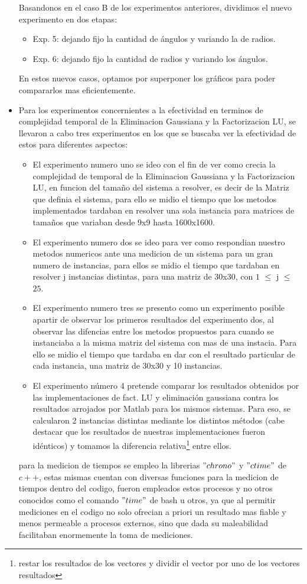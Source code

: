 \documentclass[12pt,a4paper]{article}
\begin{document}
\begin{itemize}
    Basandonos en el caso B de los experimentos anteriores, dividimos el nuevo experimento en dos etapas:
    \begin{itemize}
    	\item Exp. 5: dejando fijo la cantidad de ángulos y variando la de radios.
	    \item Exp. 6: dejando fijo la cantidad de radios y variando los ángulos.
   	\end{itemize}
En estos nuevos casos, optamos por superponer los gráficos para poder compararlos mas eficientemente.
    
   \item Para los experimentos concernientes a la efectividad en terminos de complejidad temporal de la Eliminacion Gaussiana y la Factorizacion LU, se llevaron a cabo tres experimentos en los que se buscaba ver la efectividad de estos para diferentes aspectos:
    \begin{itemize}
		\item El experimento numero uno se ideo con el fin de ver como crecia la complejidad de temporal de la Eliminacion Gaussiana y la Factorizacion LU, en funcion del tamaño del sistema a resolver, es decir de la Matriz que definia el sistema, para ello se midio el tiempo que los metodos implementados tardaban en resolver una sola instancia para matrices de tamaños que variaban desde 9x9 hasta 1600x1600.
		\item El experimento numero dos se ideo para ver como respondian nuestro metodos numericos ante una medicion de un sistema para un gran numero de instancias, para ellos se midio el tiempo que tardaban en resolver j instancias distintas, para una matriz de 30x30, con $1$ $\leq$ j $\leq$ $25$.   
        \item El experimento numero tres se presento como un experimento posible apartir de observar los primeros resultados del experimento dos, al observar las difencias entre los metodos propuestos para cuando se instanciaba a la misma matriz del sistema con mas de una instacia. Para ello se midio el tiempo que tardaba en dar con el resultado particular de cada instancia, una matriz de 30x30 y 10 instancias.
        \item El experimento número 4 pretende comparar los resultados obtenidos por las implementaciones de fact. LU y eliminación gaussiana contra los resultados arrojados por Matlab para los mismos sistemas. Para eso, se calcularon 2 instancias distintas mediante los distintos métodos (cabe destacar que los resultados de nuestras implementaciones fueron idénticos) y tomamos la diferencia relativa\footnote{restar los resultados de los vectores y dividir el vector por uno de los vectores resultados} entre ellos.
	\end{itemize}
para la medicion de tiempos se empleo la librerias $"chrono"$ y $"ctime"$ de $c++$, estas mismas cuentan con diversas funciones para la medicion de tiempos dentro del codigo, fueron empleados estos procesos y no otros conocidos como el comando $"time"$ de bash u otros, ya que al permitir mediciones en el codigo no solo ofrecian a priori un resultado mas fiable y menos permeable a procesos externos, sino que dada su maleabilidad facilitaban enormemente la toma de mediciones.


\end{itemize}
\end{document}
